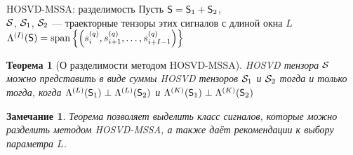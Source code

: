 \documentclass[pdf, unicode, 9pt, notheorems, handout]{beamer}
\newtheorem{theorem}{Теорема}
\newtheorem{remark}{Замечание}
\begin{document}
    \begin{frame}{HOSVD-MSSA: разделимость}
        Пусть $\mathsf{S} = \mathsf{S}_1 + \mathsf{S}_2$, \\ 
        $\mathcal{S}$, $\mathcal{S}_1$, $\mathcal{S}_2$ --- траекторные тензоры этих сигналов с длиной
        окна $L$\\ \vspace{0.2cm}
        $\Lambda^{(I)}(\mathsf{S}) = \operatorname{span}\left\{\left(s_i^{(q)}, s_{i+1}^{(q)}, \ldots, s_{i + I - 1}^{(q)}\right)\right\}$
        \begin{theorem}[О разделимости методом HOSVD-MSSA]
            \textup{HOSVD} тензора $\mathcal{S}$ можно представить в виде суммы \textup{HOSVD} тензоров $\mathcal{S}_1$ и
            $\mathcal{S}_2$ тогда и только тогда, когда
            $\Lambda^{(L)}(\mathsf{S}_1) \perp \Lambda^{(L)}(\mathsf{S}_2)$ и 
            $\Lambda^{(K)}(\mathsf{S}_1)\perp\Lambda^{(K)}(\mathsf{S}_2)$
        \end{theorem}
        \vspace{0.2cm}
        \begin{remark}
            Теорема позволяет выделить класс сигналов, которые можно разделить методом \textup{HOSVD-MSSA},
            а также даёт рекомендации к выбору параметра $L$.
        \end{remark}
    \end{frame}
   
    
\end{document}
